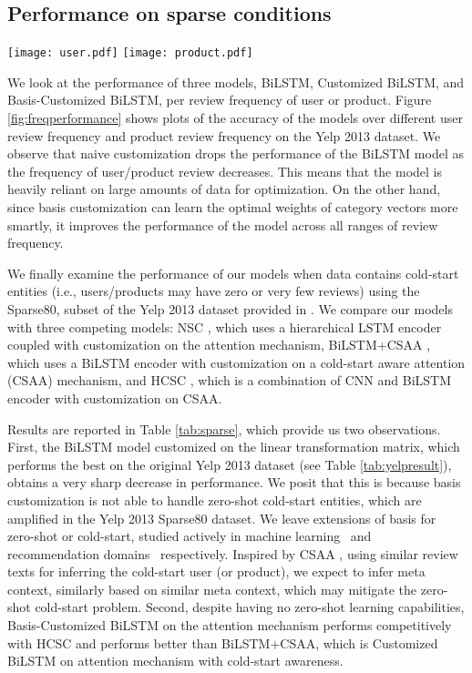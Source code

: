 \documentclass[11pt,a4paper]{article}
\begin{document}
\subsection{Performance on sparse conditions}

\begin{figure*}
    \centering
    \texttt{[image: user.pdf]}
    \texttt{[image: product.pdf]}
    \caption{Accuracy per user/product review frequency on Yelp 2013 dataset. The review frequency value  represents the frequencies in the range , except when , where it represents the frequencies in the range .}
    \label{fig:freqperformance}
\end{figure*}

We look at the performance of three models, BiLSTM, Customized BiLSTM, and Basis-Customized BiLSTM, per review frequency of user or product. Figure \ref{fig:freqperformance} shows plots of the accuracy of the models over different user review frequency and product review frequency on the Yelp 2013 dataset. 
We observe that naive customization drops the performance of the BiLSTM model as the frequency of user/product review decreases.
This means that the model is heavily reliant on large amounts of data for optimization. On the other hand, since basis customization can learn the optimal weights of category vectors more smartly, it improves the performance of the model across all ranges of review frequency.

We finally examine the performance of our models when data contains cold-start entities (i.e., users/products may have zero or very few reviews) using the Sparse80, subset of the Yelp 2013 dataset provided in \cite{amplayo2018cold}. We compare our models with three competing models: NSC \cite{chen2016neural}, which uses a hierarchical LSTM encoder coupled with customization on the attention mechanism, BiLSTM+CSAA \cite{amplayo2018cold}, which uses a BiLSTM encoder with customization on a cold-start aware attention (CSAA) mechanism, and HCSC \cite{amplayo2018cold}, which is a combination of CNN and BiLSTM encoder with customization on CSAA. 

Results are reported in Table \ref{tab:sparse}, which provide us two observations. First, the BiLSTM model customized on the linear transformation matrix, which performs the best on the original Yelp 2013 dataset (see Table \ref{tab:yelpresult}), obtains a very sharp decrease in performance. We posit that this is because basis customization is not able to handle zero-shot cold-start entities, which are amplified in the Yelp 2013 Sparse80 dataset. 
We leave extensions of basis for zero-shot or cold-start, studied actively in machine learning~\cite{wang2019survey} and recommendation domains~\cite{sun2012survey} respectively.
Inspired by CSAA \cite{amplayo2018cold}, using similar review texts for inferring the cold-start user
(or product), we expect to infer meta context, similarly based on similar meta context, which
 may mitigate the zero-shot cold-start problem.
Second, despite having no zero-shot learning capabilities, Basis-Customized BiLSTM on the attention mechanism performs competitively with HCSC and performs better than BiLSTM+CSAA, which is Customized BiLSTM on attention mechanism with cold-start awareness.
\end{document}
